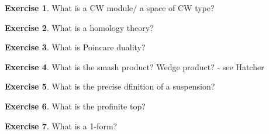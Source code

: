 \documentclass[12pt]{article} %
\theoremstyle{definition}
\newtheorem*{exer}{Exercise}
\begin{document}
  \begin{exer}
   What is a CW module/ a space of CW type?
  \end{exer}

  \begin{exer}
   What is a homology theory?
  \end{exer}

  \begin{exer}
   What is Poincare duality?
  \end{exer}
\begin{exer}
 What is the smash product? Wedge product?   - see Hatcher

\end{exer}
\begin{exer}
 What is the precise dfinition of a suspension?
\end{exer}

\begin{exer}
 What is the profinite top?
 
\end{exer}

\begin{exer}
 What is a 1-form?
\end{exer}

  
\end{document}
